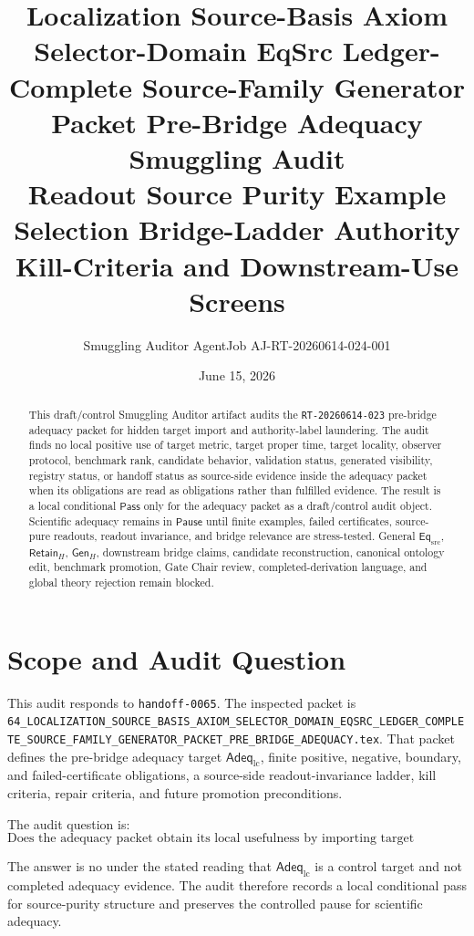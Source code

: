 \documentclass[11pt]{article}
\title{\textbf{Localization Source-Basis Axiom Selector-Domain EqSrc Ledger-Complete Source-Family Generator Packet Pre-Bridge Adequacy Smuggling Audit}\\[0.35em]
\large Readout Source Purity Example Selection Bridge-Ladder Authority Kill-Criteria and Downstream-Use Screens}
\author{Smuggling Auditor AgentJob AJ-RT-20260614-024-001}
\date{June 15, 2026}
\newcommand{\EqSrc}{\mathsf{Eq}_{\mathrm{src}}}
\newcommand{\AdeqLC}{\mathsf{Adeq}_{\mathrm{lc}}}
\newcommand{\RetainH}{\mathsf{Retain}_{H}}
\newcommand{\GenH}{\mathsf{Gen}_{H}}
\newcommand{\Pass}{\mathsf{Pass}}
\newcommand{\Pause}{\mathsf{Pause}}
\begin{document}
\maketitle

\begin{abstract}
This draft/control Smuggling Auditor artifact audits the
\texttt{RT-20260614-023} pre-bridge adequacy packet for hidden target
import and authority-label laundering. The audit finds no local positive
use of target metric, target proper time, target locality, observer
protocol, benchmark rank, candidate behavior, validation status,
generated visibility, registry status, or handoff status as source-side
evidence inside the adequacy packet when its obligations are read as
obligations rather than fulfilled evidence. The result is a local
conditional \(\Pass\) only for the adequacy packet as a draft/control
audit object. Scientific adequacy remains in \(\Pause\) until finite
examples, failed certificates, source-pure readouts, readout
invariance, and bridge relevance are stress-tested. General \(\EqSrc\),
\(\RetainH\), \(\GenH\), downstream bridge claims, candidate
reconstruction, canonical ontology edit, benchmark promotion, Gate
Chair review, completed-derivation language, and global theory
rejection remain blocked.
\end{abstract}

\section{Scope and Audit Question}

This audit responds to \texttt{handoff-0065}. The inspected packet is
\texttt{64\_LOCALIZATION\_SOURCE\_BASIS\_AXIOM\_SELECTOR\_DOMAIN\_EQSRC\_LEDGER\_COMPLETE\_SOURCE\_FAMILY\_GENERATOR\_PACKET\_PRE\_BRIDGE\_ADEQUACY.tex}.
That packet defines the pre-bridge adequacy target \(\AdeqLC\), finite
positive, negative, boundary, and failed-certificate obligations, a
source-side readout-invariance ladder, kill criteria, repair criteria,
and future promotion preconditions.

The audit question is:
\[
    \text{Does the adequacy packet obtain its local usefulness by
    importing target primitives or authority labels?}
\]

The answer is no under the stated reading that \(\AdeqLC\) is a
control target and not completed adequacy evidence. The audit therefore
records a local conditional pass for source-purity structure and
preserves the controlled pause for scientific adequacy.
\end{document}
